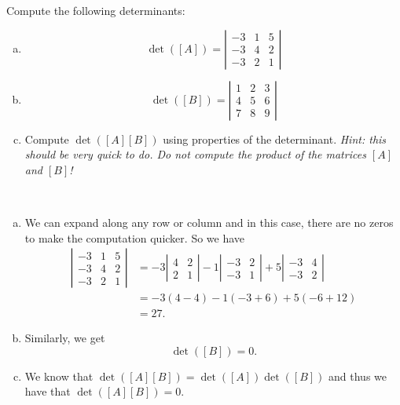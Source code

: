 \documentclass[12pt]{article} %
\begin{document}
\newpage
\begin{problem}
Compute the following determinants:
\begin{enumerate}[(a)]
    \item
    \[
    \det([A])=\left| \begin{array}{ccc}
    -3& 1 & 5\\
    -3& 4 & 2\\
    -3& 2 & 1
    \end{array}\right|
    \]
    \item 
    \[
    \det([B])=\left| \begin{array}{ccc}
    1& 2& 3\\
    4& 5& 6\\
    7& 8& 9
    \end{array}\right|
    \]
    \item Compute $\det([A][B])$ using properties of the determinant. \emph{Hint: this should be very quick to do. Do not compute the product of the matrices $[A]$ and $[B]$!}
\end{enumerate}
\end{problem}
\begin{solution}~
\begin{enumerate}[(a)]
    \item We can expand along any row or column and in this case, there are no zeros to make the computation quicker. So we have
    \begin{align*}
        \left| \begin{matrix} -3 & 1 & 5 \\ -3 & 4 & 2 \\ -3 & 2 & 1 \end{matrix} \right| &= -3 \left| \begin{matrix} 4 & 2 \\ 2 & 1 \end{matrix} \right| -1 \left| \begin{matrix} -3 & 2 \\ -3 & 1 \end{matrix} \right| +5 \left| \begin{matrix} -3 & 4 \\ -3 & 2 \end{matrix} \right|\\
        &= -3(4-4)-1(-3+6)+5(-6+12)\\
        &= 27.
    \end{align*}
    \item Similarly, we get
    \[
    \det([B])= 0.
    \]
    \item We know that $\det([A][B])=\det([A])\det([B])$ and thus we have that $\det([A][B])=0.$
\end{enumerate}
\end{solution}
\end{document}
